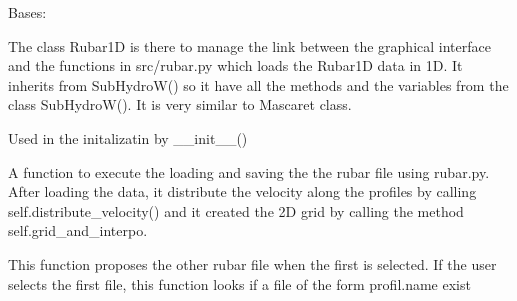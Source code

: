 \documentclass[letterpaper,10pt,english]{sphinxmanual}
\begin{document}
\begin{fulllineitems}
\label{\detokenize{index:src_GUI.hydro_GUI_2.Rubar1D}}
Bases: {\hyperref[\detokenize{index:src_GUI.hydro_GUI_2.SubHydroW}]{}}

The class Rubar1D is there to manage the link between the graphical interface and the functions in src/rubar.py
which loads the Rubar1D data in 1D. It inherits from SubHydroW() so it have all the methods and the variables
from the class SubHydroW(). It is very similar to Mascaret class.

\begin{fulllineitems}
\label{\detokenize{index:src_GUI.hydro_GUI_2.Rubar1D.init_iu}}
Used in the initalizatin by \_\_init\_\_()

\end{fulllineitems}


\begin{fulllineitems}
\label{\detokenize{index:src_GUI.hydro_GUI_2.Rubar1D.load_rubar1d}}
A function to execute the loading and saving the the rubar file using rubar.py. After loading the data,
it distribute the velocity along the profiles by calling self.distribute\_velocity() and it created the 2D grid
by calling the method self.grid\_and\_interpo.

\end{fulllineitems}


\begin{fulllineitems}
\label{\detokenize{index:src_GUI.hydro_GUI_2.Rubar1D.propose_next_file}}
This function proposes the other rubar file when the first is selected. If the user selects the first file,
this function looks if a file of the form profil.name exist

\end{fulllineitems}


\end{fulllineitems}
\end{document}
